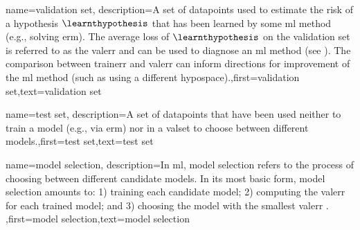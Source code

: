 {{
{name={validation set},
  description={A set of \gls{datapoint}s used to estimate 
  	the \gls{risk} of a \gls{hypothesis} $\learnthypothesis$ that has been learned by some 
  	\gls{ml} method (e.g., solving \gls{erm}). The average \gls{loss} of $\learnthypothesis$ 
  	on the \gls{validation} set is referred to as the \gls{valerr} and can be used to diagnose an 
  	\gls{ml} method (see \cite[Sec. 6.6]{MLBasics}). The comparison between \gls{trainerr} 
  	and \gls{valerr} can inform directions for improvement of the \gls{ml} method (such as 
  	using a different \gls{hypospace}).},first={validation set},text={validation set}  
}

{name={test set},
	description={A set of \gls{datapoint}s that have  
		been used neither to train a \gls{model} (e.g., via \gls{erm}) nor in a \gls{valset} 
		to choose between different \gls{model}s.},first={test set},text={test set}  
}


{name={model selection},
	description={In \gls{ml}, \gls{model} selection refers to the 
		process of choosing between different candidate \gls{model}s. In its most 
		basic form, \gls{model} selection amounts to: 1) training each candidate \gls{model}; 
		2) computing the \gls{valerr} for each trained \gls{model}; and 3) choosing the \gls{model} 
		with the smallest \gls{valerr} \cite[Ch. 6]{MLBasics}. },first={model selection},text={model selection}  
}







}}
